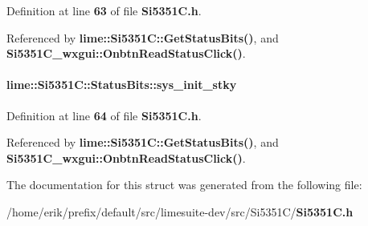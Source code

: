 Definition at line {\bf 63} of file {\bf Si5351\+C.\+h}.



Referenced by {\bf lime\+::\+Si5351\+C\+::\+Get\+Status\+Bits()}, and {\bf Si5351\+C\+\_\+wxgui\+::\+Onbtn\+Read\+Status\+Click()}.

\paragraph[{sys\+\_\+init\+\_\+stky}]{ lime\+::\+Si5351\+C\+::\+Status\+Bits\+::sys\+\_\+init\+\_\+stky}\label{structlime_1_1Si5351C_1_1StatusBits_aec3c707b9f9abe4cbda72e2282ed242d}


Definition at line {\bf 64} of file {\bf Si5351\+C.\+h}.



Referenced by {\bf lime\+::\+Si5351\+C\+::\+Get\+Status\+Bits()}, and {\bf Si5351\+C\+\_\+wxgui\+::\+Onbtn\+Read\+Status\+Click()}.



The documentation for this struct was generated from the following file\+:\begin{DoxyCompactItemize}
\item 
/home/erik/prefix/default/src/limesuite-\/dev/src/\+Si5351\+C/{\bf Si5351\+C.\+h}\end{DoxyCompactItemize}
